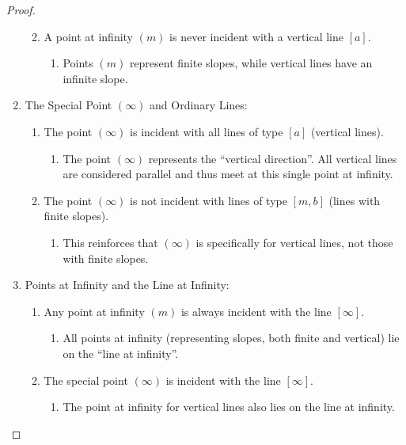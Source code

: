 \begin{proof}
\begin{enumerate}[1.]
\begin{enumerate}[-]
\begin{enumerate}[$\to$]
            \end{enumerate}
            \item A point at infinity $(m)$ is never incident with a vertical line $[a]$.
            \begin{enumerate}[$\to$]
                \item Points $(m)$ represent finite slopes, while vertical lines have an infinite slope.
            \end{enumerate}
        \end{enumerate}
        \item The Special Point $(\infty)$ and Ordinary Lines:
        \begin{enumerate}[-]
            \item The point $(\infty)$ is incident with all lines of type $[a]$ (vertical lines).
            \begin{enumerate}[$\to$]
                \item The point $(\infty)$ represents the ``vertical direction''. All vertical lines are considered parallel and thus meet at this single point at infinity.
            \end{enumerate}
            \item The point $(\infty)$ is not incident with lines of type $[m, b]$ (lines with finite slopes).
            \begin{enumerate}[$\to$]
                \item This reinforces that $(\infty)$ is specifically for vertical lines, not those with finite slopes.
            \end{enumerate}
        \end{enumerate}
        \item Points at Infinity and the Line at Infinity:
        \begin{enumerate}[-]
            \item Any point at infinity $(m)$ is always incident with the line $[\infty]$.
            \begin{enumerate}[$\to$]
                \item All points at infinity (representing slopes, both finite and vertical) lie on the ``line at infinity''.
            \end{enumerate}
            \item The special point $(\infty)$ is incident with the line $[\infty]$.
            \begin{enumerate}[$\to$]
                \item The point at infinity for vertical lines also lies on the line at infinity.
            \end{enumerate}
        \end{enumerate}
    \end{enumerate}
    \normalsize


\end{proof}
